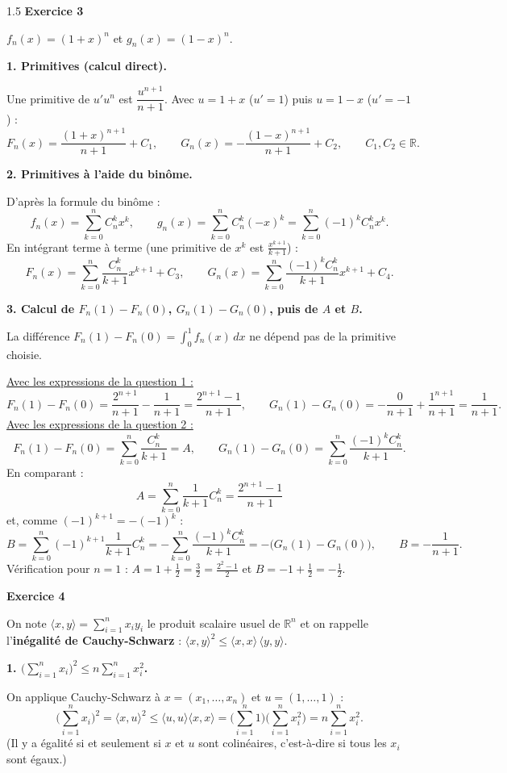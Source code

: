 \documentclass[12pt]{article}
\begin{document}
\begin{spacing}{1.5}
\medskip\textbf{Exercice 3}

$f_n(x)=(1+x)^n$ et $g_n(x)=(1-x)^n$.

\textbf{1. Primitives (calcul direct).}

Une primitive de $u'u^n$ est $\dfrac{u^{n+1}}{n+1}$. Avec $u=1+x$ ($u'=1$) puis $u=1-x$ ($u'=-1$) :
\[
F_n(x)=\frac{(1+x)^{n+1}}{n+1}+C_1,\qquad G_n(x)=-\frac{(1-x)^{n+1}}{n+1}+C_2,\qquad C_1,C_2\in\mathbb{R}.
\]

\textbf{2. Primitives à l'aide du binôme.}

D'après la formule du binôme :
\[
f_n(x)=\sum_{k=0}^nC_n^kx^k,\qquad g_n(x)=\sum_{k=0}^nC_n^k(-x)^k=\sum_{k=0}^n(-1)^kC_n^kx^k .
\]
En intégrant terme à terme (une primitive de $x^k$ est $\frac{x^{k+1}}{k+1}$) :
\[
F_n(x)=\sum_{k=0}^n\frac{C_n^k}{k+1}x^{k+1}+C_3,\qquad G_n(x)=\sum_{k=0}^n\frac{(-1)^kC_n^k}{k+1}x^{k+1}+C_4 .
\]

\textbf{3. Calcul de $F_n(1)-F_n(0)$, $G_n(1)-G_n(0)$, puis de $A$ et $B$.}

La différence $F_n(1)-F_n(0)=\int_0^1f_n(x)\,dx$ ne dépend pas de la primitive choisie.

\underline{Avec les expressions de la question 1 :}
\[
F_n(1)-F_n(0)=\frac{2^{n+1}}{n+1}-\frac{1}{n+1}=\frac{2^{n+1}-1}{n+1},\qquad
G_n(1)-G_n(0)=-\frac{0}{n+1}+\frac{1^{n+1}}{n+1}=\frac{1}{n+1}.
\]
\underline{Avec les expressions de la question 2 :}
\[
F_n(1)-F_n(0)=\sum_{k=0}^n\frac{C_n^k}{k+1}=A,\qquad G_n(1)-G_n(0)=\sum_{k=0}^n\frac{(-1)^kC_n^k}{k+1}.
\]
En comparant :
\[
\boxed{A=\sum_{k=0}^n\frac{1}{k+1}C_n^k=\frac{2^{n+1}-1}{n+1}}
\]
et, comme $(-1)^{k+1}=-(-1)^k$ :
\[
B=\sum_{k=0}^n(-1)^{k+1}\frac{1}{k+1}C_n^k=-\sum_{k=0}^n\frac{(-1)^kC_n^k}{k+1}=-\big(G_n(1)-G_n(0)\big),\qquad\boxed{B=-\frac{1}{n+1}}.
\]
Vérification pour $n=1$ : $A=1+\frac12=\frac32=\frac{2^2-1}{2}$ et $B=-1+\frac12=-\frac12$.

\medskip\textbf{Exercice 4}

On note $\langle x,y\rangle=\sum_{i=1}^nx_iy_i$ le produit scalaire usuel de $\mathbb{R}^n$ et on rappelle l'\textbf{inégalité de Cauchy-Schwarz} : $\langle x,y\rangle^2\le\langle x,x\rangle\,\langle y,y\rangle$.

\textbf{1. $\Big(\sum_{i=1}^nx_i\Big)^2\le n\sum_{i=1}^nx_i^2$.}

On applique Cauchy-Schwarz à $x=(x_1,\dots,x_n)$ et $u=(1,\dots,1)$ :
\[
\Big(\sum_{i=1}^nx_i\Big)^2=\langle x,u\rangle^2\le\langle u,u\rangle\langle x,x\rangle=\Big(\sum_{i=1}^n1\Big)\Big(\sum_{i=1}^nx_i^2\Big)=n\sum_{i=1}^nx_i^2 .
\]
(Il y a égalité si et seulement si $x$ et $u$ sont colinéaires, c'est-à-dire si tous les $x_i$ sont égaux.)


\end{spacing}
\end{document}
